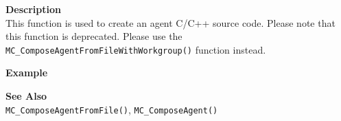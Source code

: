 \noindent
{\bf Description}\\
This function is used to create an agent C/C++ source code. 
Please note that this function is deprecated. Please use the
\texttt{MC\_ComposeAgentFromFileWithWorkgroup()} function instead.

\noindent
{\bf Example}\\
\noindent
{\footnotesize}

\noindent
{\bf See Also}\\
\texttt{MC\_ComposeAgentFromFile()}, \texttt{MC\_ComposeAgent()}

